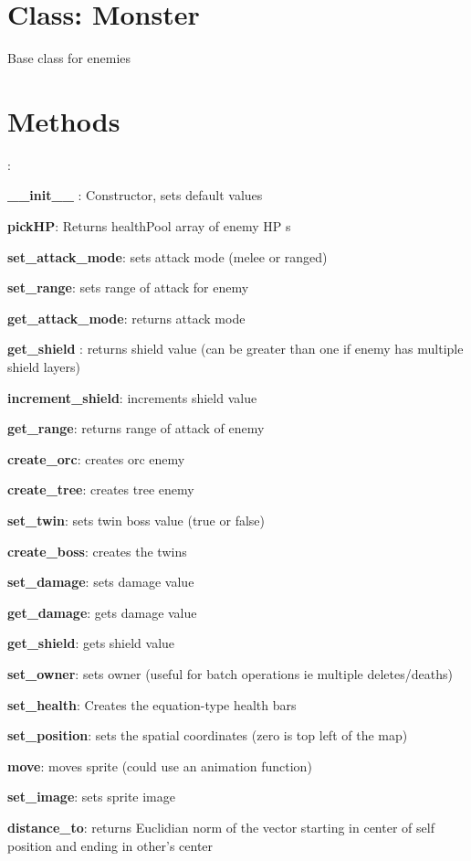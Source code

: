 \documentclass{article}
\begin{document}
\raggedright

\section{Class: Monster}

Base class for enemies


\section{Methods} :

\textbf{\_\_init\_\_ }: Constructor, sets default values

\textbf{pickHP}: Returns healthPool array of enemy HP s

\textbf{set\_attack\_mode}: sets attack mode (melee or ranged)

\textbf{set\_range}: sets range of attack for enemy

\textbf{get\_attack\_mode}: returns attack mode

\textbf{get\_shield }: returns shield value (can be greater than one if enemy has multiple shield layers)

\textbf{increment\_shield}: increments shield value

\textbf{get\_range}: returns range of attack of enemy

\textbf{create\_orc}: creates orc enemy

\textbf{create\_tree}: creates tree enemy

\textbf{set\_twin}: sets twin boss value (true or false)

\textbf{create\_boss}: creates the twins

\textbf{set\_damage}: sets damage value

\textbf{get\_damage}: gets damage value


\textbf{get\_shield}: gets shield value

\textbf{set\_owner}: sets owner (useful for batch operations ie multiple deletes/deaths)

\textbf{set\_health}: Creates the equation-type health bars

\textbf{set\_position}: sets the spatial coordinates (zero is top left of the map)

\textbf{move}: moves sprite (could use an animation function)

\textbf{set\_image}: sets sprite image

\textbf{distance\_to}: returns Euclidian norm of the vector starting in center of self position and ending in other's center
\end{document}
